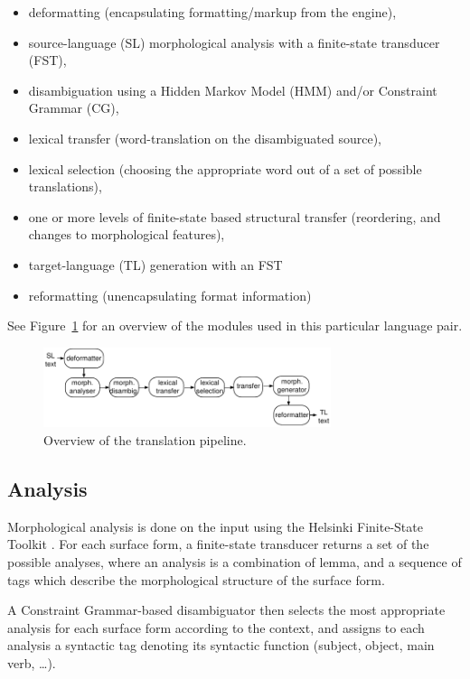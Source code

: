 \documentclass[a4paper,11pt,twocolumn]{article}
\begin{document}
\begin{itemize}
\item deformatting (encapsulating formatting/markup from the engine),
\item source-language (SL) morphological analysis with a finite-state
  transducer (FST),
\item disambiguation using a Hidden Markov Model (HMM) and/or
  Constraint Grammar (CG), 
\item lexical transfer (word-translation on the disambiguated source),
\item lexical selection (choosing the appropriate word out of a set of possible
   translations),
\item one or more levels of finite-state based structural transfer
  (reordering, and changes to morphological features),
\item target-language (TL) generation with an FST
\item reformatting (unencapsulating format information)
\end{itemize}

See Figure~\ref{fig:pipeline} for an overview of the modules used
in this particular language pair.

\begin{figure}
 \centering
 \includegraphics[width=0.75\textwidth]{architecture-overview.pdf}
 \caption{Overview of the translation pipeline.}
 \label{fig:pipeline}
\end{figure}

\subsection{Analysis}

Morphological analysis is done on the input using the Helsinki Finite-State
Toolkit \cite{linden2011}. For each surface form, a finite-state transducer
returns a set of the possible analyses, where an analysis is a combination
of lemma, and a sequence of tags which describe the morphological structure
of the surface form.

A Constraint Grammar-based disambiguator then selects the most appropriate 
analysis for each surface form according to the context, and assigns to each 
analysis a syntactic tag denoting its syntactic function (subject, object, 
main verb, \ldots).
\end{document}
